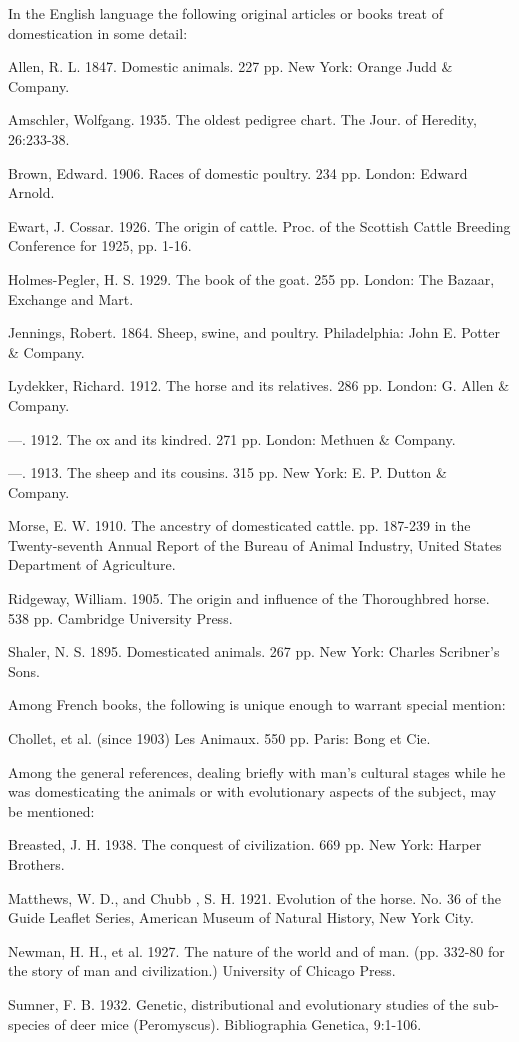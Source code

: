 In the English language the following original articles or books treat of domestication in some detail:

\begin{hangparas}{0.5in}{1}%
Allen, R. L. 1847. Domestic animals. 227 pp. New York: Orange Judd \& Company.

Amschler, Wolfgang. 1935. The oldest pedigree chart. The Jour. of Heredity, 26:233-38.

Brown, Edward. 1906. Races of domestic poultry. 234 pp. London: Edward Arnold.

Ewart, J. Cossar. 1926. The origin of cattle. Proc. of the Scottish Cattle Breeding Conference for 1925, pp. 1-16.

Holmes-Pegler, H. S. 1929. The book of the goat. 255 pp. London: The Bazaar, Exchange and Mart.

Jennings, Robert. 1864. Sheep, swine, and poultry. Philadelphia: John E. Potter \& Company.

Lydekker, Richard. 1912. The horse and its relatives. 286 pp. London: G. Allen \& Company.

---. 1912. The ox and its kindred. 271 pp. London: Methuen \& Company.

---. 1913. The sheep and its cousins. 315 pp. New York: E. P. Dutton \& Company.

Morse, E. W. 1910. The ancestry of domesticated cattle. pp. 187-239 in the Twenty-seventh Annual Report of the Bureau of Animal Industry, United States Department of Agriculture.

Ridgeway, William. 1905. The origin and influence of the Thoroughbred horse. 538 pp. Cambridge University Press.

Shaler, N. S. 1895. Domesticated animals. 267 pp. New York: Charles Scribner's Sons.

Among French books, the following is unique enough to warrant special mention:

Chollet, et al. (since 1903) Les Animaux. 550 pp. Paris: Bong et Cie.
\end{hangparas}

Among the general references, dealing briefly with man's cultural stages while he was domesticating the 
animals or with evolutionary aspects of the subject, may be mentioned:

\begin{hangparas}{0.5in}{1}%
Breasted, J. H. 1938. The conquest of civilization. 669 pp. New York: Harper Brothers.

Matthews, W. D., and Chubb , S. H. 1921. Evolution of the horse. No. 36 of the Guide Leaflet Series, American Museum of 
Natural History, New York City.

Newman, H. H., et al. 1927. The nature of the world and of man. (pp. 332-80 for the story of man and civilization.) 
University of Chicago Press.

Sumner, F. B. 1932. Genetic, distributional and evolutionary studies of the sub-species of deer mice (Peromyscus). Bibliographia Genetica, 9:1-106.
\end{hangparas}